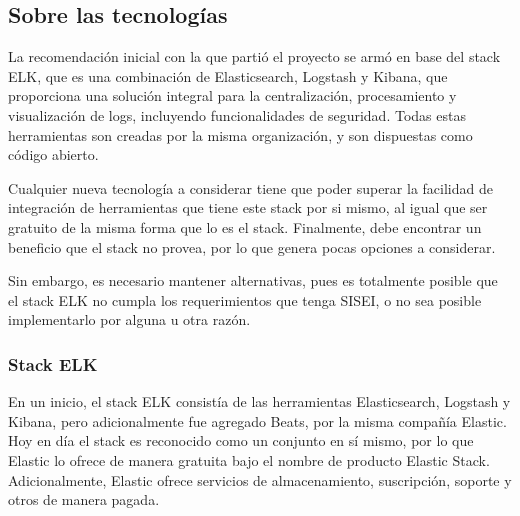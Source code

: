 \subsection{Sobre las tecnologías}

La recomendación inicial con la que partió el proyecto se armó en base del stack ELK, que es una combinación de Elasticsearch, Logstash y Kibana, que proporciona una solución integral para la centralización, procesamiento y visualización de logs, incluyendo funcionalidades de seguridad. Todas estas herramientas son creadas por la misma organización, y son dispuestas como código abierto.

Cualquier nueva tecnología a considerar tiene que poder superar la facilidad de integración de herramientas que tiene este stack por si mismo, al igual que ser gratuito de la misma forma que lo es el stack. Finalmente, debe encontrar un beneficio que el stack no provea, por lo que genera pocas opciones a considerar.

Sin embargo, es necesario mantener alternativas, pues es totalmente posible que el stack ELK no cumpla los requerimientos que tenga SISEI, o no sea posible implementarlo por alguna u otra razón.

\subsubsection{Stack ELK}

En un inicio, el stack ELK consistía de las herramientas Elasticsearch, Logstash y Kibana, pero adicionalmente fue agregado Beats, por la misma compañía Elastic. Hoy en día el stack es reconocido como un conjunto en sí mismo, por lo que Elastic lo ofrece de manera gratuita bajo el nombre de producto Elastic Stack. Adicionalmente, Elastic ofrece servicios de almacenamiento, suscripción, soporte y otros de manera pagada.


